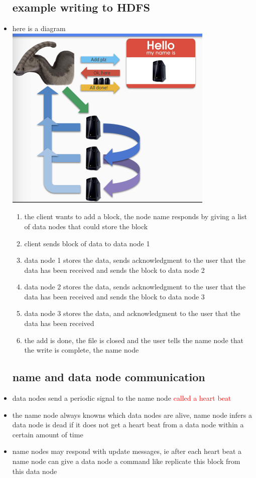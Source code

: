\documentclass{article}
\begin{document}
\begin{itemize}
\subsection*{example writing to HDFS}
\item here is a diagram \includegraphics*[width=10cm]{images/Screenshot 2023-05-09 at 5.00.13 PM.png}
\begin{enumerate}
    \item the client wants to add a block, the node name responds by giving a list of data nodes that could store the block 
    \item client sends block of data to data node 1 
    \item data node 1 stores the data, sends acknowledgment to the user that the data has been received and sends the block to data node 2 
    \item data node 2 stores the data, sends acknowledgment to the user that the data has been received and sends the block to data node 3
    \item data node 3 stores the data, and  acknowledgment to the user that the data has been received
    \item  the add is done, the file is closed and the user tells the name node that the write is complete, the name node 
\end{enumerate}
\subsection*{name and data node communication}
\item data nodes send a periodic signal to the name node \textcolor{red}{called a heart beat}
\item the name node always knowns which data nodes are alive, name node infers a data node is dead if it does not get a heart beat from a data node within a certain amount of time 
\item name nodes may respond with update messages, ie after each heart beat a name node can give a data node a command like replicate this block from this data node 

\end{itemize}
\end{document}
